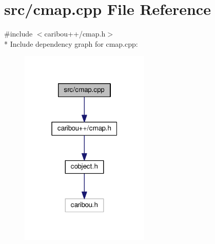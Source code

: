 \section{src/cmap.cpp File Reference}
\label{cmap_8cpp}
{\ttfamily \#include $<$caribou++/cmap.\+h$>$}\\*
Include dependency graph for cmap.\+cpp\+:
\nopagebreak
\begin{figure}[H]
\begin{center}
\leavevmode
\includegraphics[width=175pt]{cmap_8cpp__incl}
\end{center}
\end{figure}
